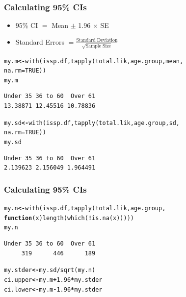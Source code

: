 \documentclass{beamer}\usepackage[]{graphicx}\usepackage[]{color}
\makeatletter
\newcommand{\hlnum}[1]{\textcolor[rgb]{0.533,0,0.133}{#1}}%
\newcommand{\hlopt}[1]{\textcolor[rgb]{0,0,0}{\textbf{#1}}}%
\newcommand{\hlstd}[1]{\textcolor[rgb]{0,0,0}{#1}}%
\newcommand{\hlkwa}[1]{\textcolor[rgb]{0.4,0.067,0.067}{\textbf{#1}}}%
\newcommand{\hlkwb}[1]{\textcolor[rgb]{0,0,0.4}{\textbf{#1}}}%
\newcommand{\hlkwc}[1]{\textcolor[rgb]{0,0,0.4}{#1}}%
\newcommand{\hlkwd}[1]{\textcolor[rgb]{0,0.267,0.4}{#1}}%
\newenvironment{kframe}{%
 \def\at@end@of@kframe{}%
 \ifinner\ifhmode%
  \def\at@end@of@kframe{\end{minipage}}%
  \begin{minipage}{\columnwidth}%
 \fi\fi%
 \def\FrameCommand##1{\hskip\@totalleftmargin \hskip-\fboxsep
 \colorbox{shadecolor}{##1}\hskip-\fboxsep
     \hskip-\linewidth \hskip-\@totalleftmargin \hskip\columnwidth}%
 \MakeFramed {\advance\hsize-\width
   \@totalleftmargin\z@ \linewidth\hsize
   \@setminipage}}%
 {\par\unskip\endMakeFramed%
 \at@end@of@kframe}
\newenvironment{knitrout}{}{} %
\makeatother
\begin{document}
\begin{frame}[fragile]
  \frametitle{Calculating 95\% CIs}
\begin{itemize}
\item 95\% CI $=$ Mean $\pm$ 1.96 $\times$ SE
\item Standard Errors $= \frac{\text{Standard Deviation}}{\sqrt{\text{Sample Size}}}$
\end{itemize}
\begin{knitrout}
\color{fgcolor}\begin{kframe}
\begin{alltt}
\hlstd{my.m} \hlkwb{<-} \hlkwd{with}\hlstd{(issp.df,} \hlkwd{tapply}\hlstd{(total.lik, age.group, mean,}
                             \hlkwc{na.rm} \hlstd{=} \hlnum{TRUE}\hlstd{))}
\hlstd{my.m}
\end{alltt}
\begin{verbatim}
Under 35 36 to 60  Over 61 
13.38871 12.45516 10.78836 
\end{verbatim}
\begin{alltt}
\hlstd{my.sd} \hlkwb{<-} \hlkwd{with}\hlstd{(issp.df,} \hlkwd{tapply}\hlstd{(total.lik, age.group, sd,}
                              \hlkwc{na.rm} \hlstd{=} \hlnum{TRUE}\hlstd{))}
\hlstd{my.sd}
\end{alltt}
\begin{verbatim}
Under 35 36 to 60  Over 61 
2.139623 2.156049 1.964491 
\end{verbatim}
\end{kframe}
\end{knitrout}
\end{frame}


\begin{frame}[fragile]
  \frametitle{Calculating 95\% CIs}
\begin{knitrout}
\color{fgcolor}\begin{kframe}
\begin{alltt}
\hlstd{my.n} \hlkwb{<-} \hlkwd{with}\hlstd{(issp.df,} \hlkwd{tapply}\hlstd{(total.lik, age.group,}
            \hlkwa{function}\hlstd{(}\hlkwc{x}\hlstd{)}\hlkwd{length}\hlstd{(}\hlkwd{which}\hlstd{(}\hlopt{!}\hlkwd{is.na}\hlstd{(x)))))}
\hlstd{my.n}
\end{alltt}
\begin{verbatim}
Under 35 36 to 60  Over 61 
     319      446      189 
\end{verbatim}
\begin{alltt}
\hlstd{my.stder} \hlkwb{<-} \hlstd{my.sd}\hlopt{/}\hlkwd{sqrt}\hlstd{(my.n)}
\hlstd{ci.upper} \hlkwb{<-} \hlstd{my.m} \hlopt{+} \hlnum{1.96}\hlopt{*}\hlstd{my.stder}
\hlstd{ci.lower} \hlkwb{<-} \hlstd{my.m} \hlopt{-} \hlnum{1.96}\hlopt{*}\hlstd{my.stder}
\end{alltt}
\end{kframe}
\end{knitrout}
\end{frame}
\end{document}
